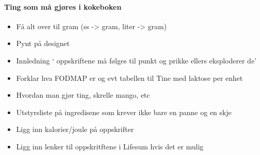
\paragraph{Ting som må gjøres i kokeboken}
\begin{itemize}[noitemsep]
  \item Få alt over til gram (ss -> gram, liter -> gram)
  \item Pynt på designet
  \item Innledning ` oppskriftene må følges til punkt og prikke ellers eksploderer de'
  \item Forklar hva FODMAP er og evt tabellen til Tine med laktose per enhet
  \item Hvordan man gjør ting, skrelle mango, etc
  \item Utstyrsliste på ingredisene som krever ikke bare en panne og en skje
  \item Ligg inn kalorier/joule på oppskrifter
  \item Ligg inn lenker til oppskritftene i Lifesum hvis det er mulig
\end{itemize}

